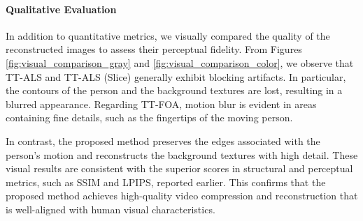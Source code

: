 \documentclass[a4paper, 11pt]{article}
\theoremstyle{plain}
\theoremstyle{definition}
\theoremstyle{remark}
\begin{document}
\paragraph{Qualitative Evaluation}
In addition to quantitative metrics, we visually compared the quality of the reconstructed images to assess their perceptual fidelity.
From Figures \ref{fig:visual_comparison_gray} and \ref{fig:visual_comparison_color}, we observe that TT-ALS and TT-ALS (Slice) generally exhibit blocking artifacts.
In particular, the contours of the person and the background textures are lost, resulting in a blurred appearance. Regarding TT-FOA, motion blur is evident in areas containing fine details, such as the fingertips of the moving person.

In contrast, the proposed method preserves the edges associated with the person's motion and reconstructs the background textures with high detail.
These visual results are consistent with the superior scores in structural and perceptual metrics, such as SSIM and LPIPS, reported earlier.
This confirms that the proposed method achieves high-quality video compression and reconstruction that is well-aligned with human visual characteristics.
\end{document}
